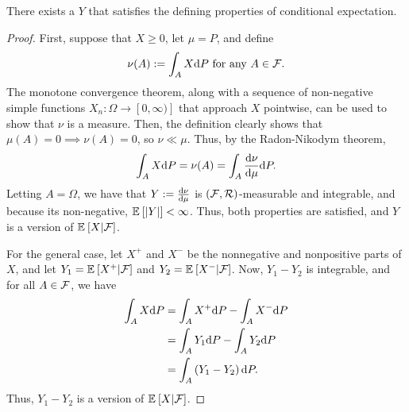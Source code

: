 \begin{lem}[Existence]
    There exists a $Y$ that satisfies the defining properties of conditional expectation.
\end{lem}
\begin{proof}
    First, suppose that $X \geq 0$, let $\mu = P$, and define
    \begin{align*}
        \nu(A) := \int_A X \text{d} P \text{ for any } A \in \mathcal{F}.
    \end{align*}
    The monotone convergence theorem, along with a sequence of non-negative simple functions $X_n: \Omega \rightarrow [0, \infty)]$ that approach $X$ pointwise, can be used to show that $\nu$ is a measure. Then, the definition clearly shows that $\mu(A) = 0 \implies \nu(A) = 0$, so $\nu \ll \mu$. Thus, by the Radon-Nikodym theorem,
    \begin{align*}
        \int_A X \text{d} P = \nu(A) = \int_A \frac{\text{d} \nu}{\text{d} \mu} \text{d} P.
    \end{align*}
    Letting $A = \Omega$, we have that $Y := \frac{\text{d} \nu}{\text{d} \mu}$ is $\left(\mathcal{F}, \mathcal{R}\right)$-measurable and integrable, and because its non-negative, ${\mathbb E}_{}\left[\left|Y\right|\right] < \infty$. Thus, both properties are satisfied, and $Y$ is a version of ${\mathbb E}_{}\left[X | \mathcal{F}\right]$. 

    For the general case, let $X^+$ and $X^-$ be the nonnegative and nonpositive parts of $X$, and let $Y_1 = {\mathbb E}_{}\left[X^+|\mathcal{F}\right]$ and $Y_2 = {\mathbb E}_{}\left[X^- | \mathcal{F}\right]$. Now, $Y_1 - Y_2$ is integrable, and for all $A \in \mathcal{F}$, we have
    \begin{align*}
        \int_A X \text{d} P &= \int_A X^+ \text{d} P - \int_A X^- \text{d} P\\
        &= \int_A Y_1 \text{d} P - \int_A Y_2 \text{d} P\\
        &= \int_A \left(Y_1 - Y_2\right) \text{d} P.
    \end{align*}
    Thus, $Y_1 - Y_2$ is a version of ${\mathbb E}_{}\left[X | \mathcal{F}\right]$.
\end{proof}




